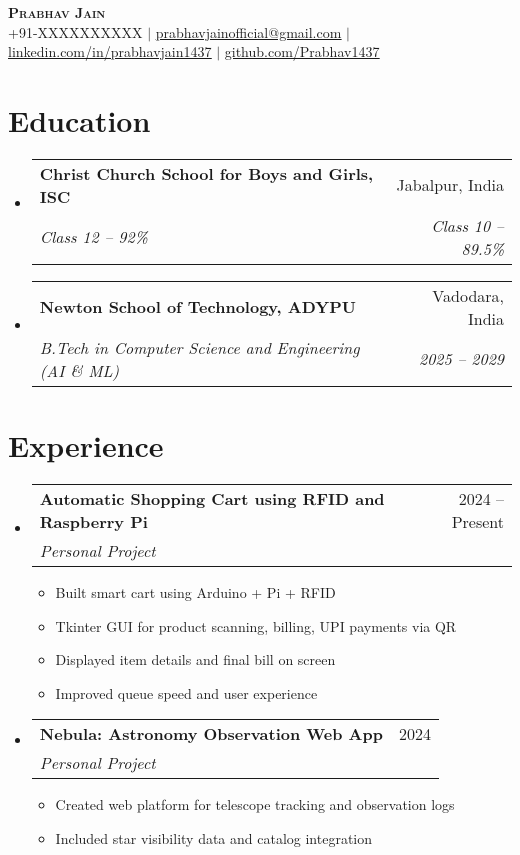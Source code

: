 \documentclass[letterpaper,11pt]{article}
\makeatletter
\newcommand{\resumeItem}[1]{
  \item\small{
    {#1 \vspace{-2pt}}
  }
}
\newcommand{\resumeSubheading}[4]{
  \vspace{-2pt}\item
    \begin{tabular*}{0.97\textwidth}[t]{l@{\extracolsep{\fill}}r}
      \textbf{#1} & #2 \\
      \textit{\small#3} & \textit{\small #4} \\
    \end{tabular*}\vspace{-7pt}
}
\newcommand{\resumeSubHeadingListStart}{\begin{itemize}[leftmargin=0.15in, label={}]}
\newcommand{\resumeSubHeadingListEnd}{\end{itemize}}
\newcommand{\resumeItemListStart}{\begin{itemize}}
\newcommand{\resumeItemListEnd}{\end{itemize}\vspace{-5pt}}
\makeatother
\begin{document}
\begin{center}
    \textbf{\Huge \scshape Prabhav Jain} \\ \vspace{1pt}
    \small +91-XXXXXXXXXX $|$ \href{mailto:prabhavjainofficial@gmail.com}{\underline{prabhavjainofficial@gmail.com}} $|$ 
    \href{https://linkedin.com/in/prabhavjain1437}{\underline{linkedin.com/in/prabhavjain1437}} $|$
    \href{https://github.com/Prabhav1437}{\underline{github.com/Prabhav1437}}
\end{center}

\section{Education}
  \resumeSubHeadingListStart
    \resumeSubheading
      {Christ Church School for Boys and Girls, ISC}{Jabalpur, India}
      {Class 12 – 92\%}{Class 10 – 89.5\%}
    \resumeSubheading
      {Newton School of Technology, ADYPU}{Vadodara, India}
      {B.Tech in Computer Science and Engineering (AI \& ML)}{2025 -- 2029}
  \resumeSubHeadingListEnd

\section{Experience}
  \resumeSubHeadingListStart

    \resumeSubheading
      {Automatic Shopping Cart using RFID and Raspberry Pi}{2024 -- Present}
      {Personal Project}{}
      \resumeItemListStart
        \resumeItem{Built smart cart using Arduino + Pi + RFID}
        \resumeItem{Tkinter GUI for product scanning, billing, UPI payments via QR}
        \resumeItem{Displayed item details and final bill on screen}
        \resumeItem{Improved queue speed and user experience}
      \resumeItemListEnd

    \resumeSubheading
      {Nebula: Astronomy Observation Web App}{2024}
      {Personal Project}{}
      \resumeItemListStart
        \resumeItem{Created web platform for telescope tracking and observation logs}
        \resumeItem{Included star visibility data and catalog integration}
      \resumeItemListEnd

  \resumeSubHeadingListEnd
\end{document}
